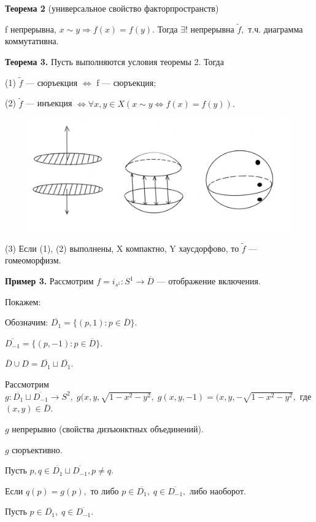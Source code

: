 \documentclass[12pt,a4paper]{article}
\begin{document}
\textbf{Теорема 2} (универсальное свойство факторпространств)

f непрерывна, $x \sim y \Rightarrow f(x) = f(y).$ Тогда $\exists!$ непрерывна $\widetilde{f},$ т.ч. диаграмма коммутативна.

\textbf{Теорема 3.} Пусть выполняются условия теоремы 2. Тогда

(1) $\widetilde{f}$ --- сюръекция $\Leftrightarrow$ f --- сюръекция;

(2) $\widetilde{f}$ --- инъекция $\Leftrightarrow \forall x, y \in X (x \sim y \Leftrightarrow f(x) = f(y)).$

\begin{figure}
	\includegraphics[width = 7 cm]{lect12_5.png}
\end{figure}

(3) Если (1), (2) выполнены, X компактно, Y хаусдорфово, то $\widetilde{f}$ --- гомеоморфизм.

\textbf{Пример 3.} Рассмотрим $f = i_{s^{1}}\!: S^{1} \to \overline{D}$ --- отображение включения.

Покажем: 

Обозначим: $\overline{D_{1}} = \{(p, 1)\!: p \in \overline{D}\}.$

$\overline{D_{-1}} = \{(p, -1)\!: p \in \overline{D}\}.$

$\overline{D} \cup D = \overline{D_{1}} \sqcup \overline{D_{1}}.$

Рассмотрим $g\!: \overline{D_{1}} \sqcup \overline{D_{-1}} \to S^{2}, \; g(x, y, \sqrt{1 - x^{2} - y^{2}}, \; g(x, y, -1) = (x, y, -\sqrt{1 - x^{2} - y^{2}},$ где $(x, y) \in \overline{D}.$

$g$ непрерывно (свойства дизъюнктных объединений).

$g$ сюръективно.

Пусть $p, q \in \overline{D_{1}} \sqcup \overline{D_{-1}}, p \neq q.$

Если $q(p) = g(p),$ то либо $p \in \overline{D_{1}}, \; q \in \overline{D_{-1}},$ либо наоборот.

Пусть $p \in \overline{D_{1}}, \; q \in \overline{D_{-1}}.$
\end{document}
